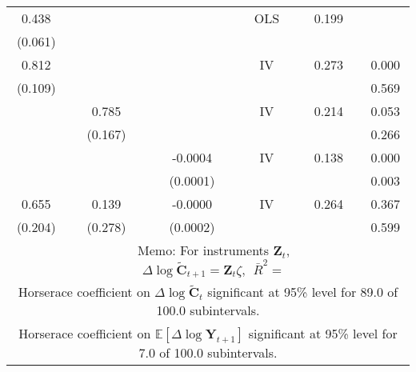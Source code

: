 \begin{table}
\begin{tabular}{cccccc}
\\ 0.438 & & & OLS & 0.199& 
\\ (0.061) & & & & & 
\\  0.812 & & & IV & 0.273 & 0.000
\\  (0.109) & & & & & 0.569
\\ & 0.785 & & IV & 0.214 & 0.053
\\ & (0.167) & & & & 0.266
\\ & & -0.0004 & IV & 0.138 & 0.000
\\ & & (0.0001) & & & 0.003
\\ 0.655 & 0.139 & -0.0000 & IV & 0.264 & 0.367
\\ (0.204) & (0.278) & (0.0002) & & & 0.599
\\ & \multicolumn{4}{c}{Memo: For instruments $\mathbf{Z}_{t}$,  $\Delta \log \widetilde{\mathbf{C}}_{t+1} = \mathbf{Z}_{t} \zeta,~~\bar{R}^{2}=$ } 0.276 & 
\\ \multicolumn{6}{c}{Horserace coefficient on $\Delta \log \widetilde{\mathbf{C}}_t$ significant at 95\% level for 89.0 of 100.0 subintervals.} 
\\ \multicolumn{6}{c}{Horserace coefficient on $\mathbb{E}[\Delta \log \mathbf{Y}_{t+1}]$ significant at 95\% level for 7.0 of 100.0 subintervals.} 
\\ \hline \hline 
\end{tabular} 
\end{table} 
